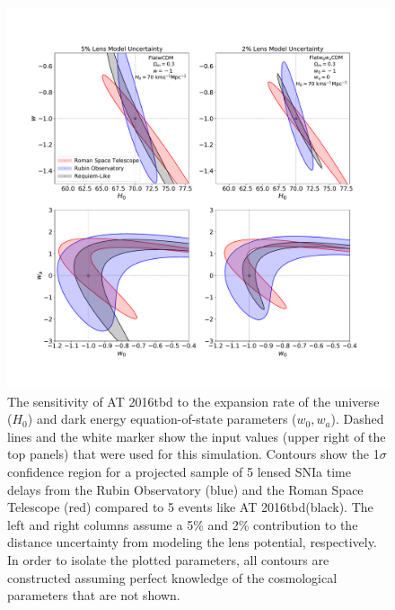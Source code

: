 \documentclass[12pt]{article}
\def\SNABC{AT 2016tbd\xspace}
\begin{document}
\clearpage
\begin{figure}
    \centering
    \includegraphics[draft=False,trim={2cm, 3cm, 3cm, 4cm},clip,width=\textwidth]{Paper/Figures/snrequiem_hw_w0wa_apples_to_lsst_ngrst_4panel.pdf}
    \caption{  
    The sensitivity of \SNABC to the expansion rate of the universe ($H_0$) and dark energy equation-of-state parameters ($w_0, w_a$). Dashed lines and the white marker show the input values (upper right of the top panels) that were used for this simulation. Contours show the 1$\sigma$ confidence region for a projected sample of 5 lensed SNIa time delays from the Rubin Observatory (blue) and the Roman Space Telescope (red) compared to 5 events like \SNABC (black).  The left and right columns assume a 5\% and 2\% contribution to the distance uncertainty from modeling the lens potential, respectively. 
    In order to isolate the plotted parameters, all contours are constructed assuming perfect knowledge of the cosmological parameters that are not shown. 
    }
    \label{fig:cosmo}
\end{figure}

\clearpage
\end{document}
